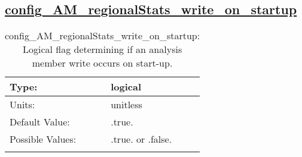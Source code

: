 \subsection[config\_AM\_regionalStats\_write\_on\_startup]{\hyperref[sec:nm_tab_AM_regionalStats]{config\_AM\_regionalStats\_write\_on\_startup}}
\label{subsec:nm_sec_config_AM_regionalStats_write_on_startup}
\begin{center}
\begin{longtable}{| p{2.0in} || p{4.0in} |}
    \hline
    Type: & logical \\
    \hline
    Units: & \si{unitless} \\
    \hline
    Default Value: & .true. \\
    \hline
    Possible Values: & .true. or .false. \\
    \hline
    \caption{config\_AM\_regionalStats\_write\_on\_startup: Logical flag determining if an analysis member write occurs on start-up.}
\end{longtable}
\end{center}
